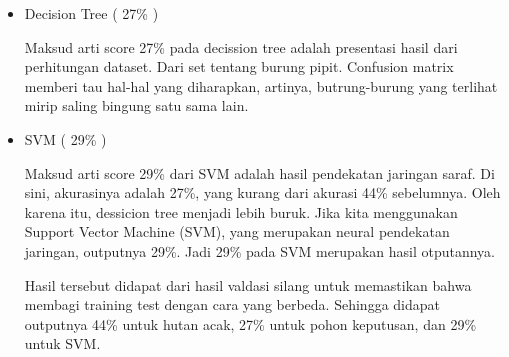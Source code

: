 \begin{enumerate}
\begin{itemize}
\item Decision Tree ( 27\% )
\par Maksud arti score 27\% pada decission tree adalah presentasi hasil dari perhitungan dataset. Dari set tentang burung pipit. Confusion matrix memberi tau hal-hal yang diharapkan, artinya, butrung-burung yang terlihat mirip saling bingung satu sama lain. 
\par

\item SVM ( 29\% )
\par Maksud arti score 29\% dari SVM adalah hasil pendekatan jaringan saraf. Di sini, akurasinya adalah 27\%, yang kurang dari akurasi 44\% sebelumnya. Oleh karena itu, dessicion tree menjadi  lebih buruk. Jika kita menggunakan Support Vector Machine (SVM), yang merupakan neural pendekatan jaringan, outputnya 29\%. Jadi 29\% pada SVM merupakan hasil otputannya.
\par
\par Hasil tersebut didapat dari hasil valdasi silang untuk memastikan bahwa membagi training test dengan cara yang berbeda. Sehingga didapat outputnya 44\% untuk hutan acak, 27\% untuk pohon keputusan, dan 29\% untuk SVM.
\par
\end{itemize}


\end{enumerate}
